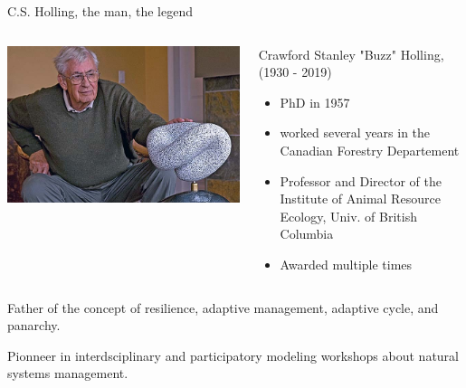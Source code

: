 \documentclass[11,aspectratio=1610]{beamer}
\begin{document}
\begin{frame}{C.S. Holling, the man, the legend}



 \begin{columns}
             \centering
             \includegraphics[width=\textwidth]{img/Holling.jpg}
\begin{scriptsize}
Crawford Stanley "Buzz" Holling, (1930 - 2019)

\begin{itemize}
  \item PhD in 1957
  \item worked several years in the Canadian Forestry Departement 
  \item Professor and Director of the Institute of Animal Resource Ecology, Univ. of British Columbia 
  \item Awarded multiple times
\end{itemize}
\end{scriptsize}
\end{columns}

\begin{small}
\vspace{1cm}
Father of the concept of \alert{resilience}, adaptive management, adaptive cycle, and panarchy. 

\vspace{0.5 cm}
Pionneer in interdsciplinary and participatory \alert{modeling workshops} about \alert{natural systems management}. 




\end{small}

\end{frame}
\end{document}
